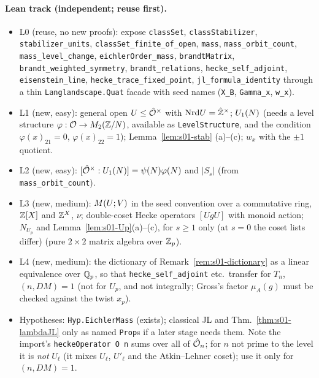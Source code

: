 \paragraph{Lean track (independent; reuse first).}
\begin{itemize}
\item L0 (reuse, no new proofs): expose \texttt{classSet}, \texttt{classStabilizer}, \texttt{stabilizer\_units},
  \texttt{classSet\_finite\_of\_open}, \texttt{mass}, \texttt{mass\_orbit\_count}, \texttt{mass\_level\_change},
  \texttt{eichlerOrder\_mass}, \texttt{brandtMatrix}, \texttt{brandt\_weighted\_symmetry}, \texttt{brandt\_relations},
  \texttt{hecke\_self\_adjoint}, \texttt{eisenstein\_line}, \texttt{hecke\_trace\_fixed\_point}, \texttt{jl\_formula\_identity}
  through a thin \texttt{Langlandscape.Quat} facade with seed names (\texttt{X\_B}, \texttt{Gamma\_x}, \texttt{w\_x}).
\item L1 (new, easy): general open $U\le\hat{\mathcal{O}}^\times$ with $\mathrm{Nrd} U=\hat{\mathbb{Z}}^\times$; $U_1(N)$ (needs a level structure
  $\varphi:\mathcal{O}\to M_2(\mathbb{Z}/N)$, available as \texttt{LevelStructure}, and the condition $\varphi(x)_{21}=0$, $\varphi(x)_{22}=1$);
  Lemma~\ref{lem:s01-stab} (a)--(c); $w_x$ with the $\pm1$ quotient.
\item L2 (new, easy): $[\hat{\mathcal{O}}^\times:U_1(N)]=\psi(N)\varphi(N)$ and $|S_s|$ (from \texttt{mass\_orbit\_count}).
\item L3 (new, medium): $M(U;V)$ in the seed convention over a commutative ring, $\mathbb{Z}[X]$ and $\mathbb{Z}^X$, $\nu$; double-coset Hecke
  operators $[UgU]$ with monoid action; $N_{U_p}$ and Lemma~\ref{lem:s01-Up}(a)--(c), for $s\ge1$ only (at $s=0$ the coset lists differ) (pure $2\times2$ matrix algebra over $\mathbb{Z}_p$).
\item L4 (new, medium): the dictionary of Remark~\ref{rem:s01-dictionary} as a linear equivalence over $\mathbb{Q}_p$, so that
  \texttt{hecke\_self\_adjoint} etc.\ transfer for $T_n$, $(n,DM)=1$ (not for $U_p$, and not integrally; Gross's factor $\mu_A(g)$ must be checked against the twist $x_p$).
\item Hypotheses: \texttt{Hyp.EichlerMass} (exists); classical JL and Thm.~\ref{thm:s01-lambdaJL} only as named \texttt{Prop}s if a
  later stage needs them. Note the import's \texttt{heckeOperator O n} sums over all of $\hat{\mathcal{O}}_n$; for $n$ not prime to the
  level it is \emph{not} $U_\ell$ (it mixes $U_\ell$, $U'_\ell$ and the Atkin--Lehner coset); use it only for $(n,DM)=1$.
\end{itemize}

